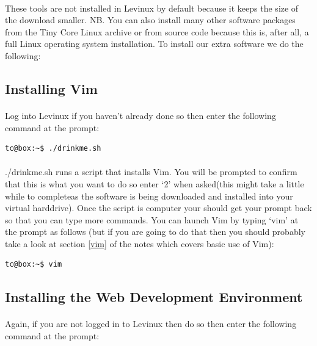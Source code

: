 \documentclass[12pt, a4paper, twoside]{book}
\begin{document}
\paragraph{} These tools are not installed in Levinux by default because it keeps the size of the download smaller. NB. You can also install many other software packages from the Tiny Core Linux archive or from source code because this is, after all, a full Linux operating system installation. To install our extra software we do the following:

\subsection{Installing Vim}

\paragraph{} Log into Levinux if you haven't already done so then enter the following command at the prompt:
\begin{lstlisting}[style=DOS]
    tc@box:~$ ./drinkme.sh
\end{lstlisting}
\paragraph{} ./drinkme.sh runs a script that installs Vim. You will be prompted to confirm that this is what you want to do so enter `2' when asked(this might take a little while to completeas the software is being downloaded and installed into your virtual harddrive). Once the script is computer your should get your prompt back so that you can type more commands. You can launch Vim by typing `vim' at the prompt as follows (but if you are going to do that then you should probably take a look at section \ref{vim} of the notes which covers basic use of Vim):

\begin{lstlisting}[style=DOS]
    tc@box:~$ vim
\end{lstlisting}

\subsection{Installing the Web Development Environment}
\label{installing_environment}
\paragraph{} Again, if you are not logged in to Levinux then do so then enter the following command at the prompt: 
\end{document}
